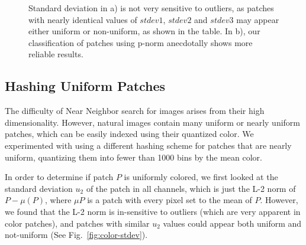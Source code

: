 \begin{figure}[ht!]
\caption{Standard deviation in a) is not very sensitive
to outliers, as patches with nearly identical
values of $stdev1$, $stdev2$ and $stdev3$ may appear
either uniform or non-uniform, as shown in the table.
In b), our classification of patches using
p-norm anecdotally shows more reliable results.}
\end{figure}

\subsection{Hashing Uniform Patches}\label{ssec:uni-nn}

The difficulty of Near Neighbor search for images arises from
their high dimensionality. However, natural images contain many uniform
or nearly uniform patches, which can be easily indexed using
their quantized color. We experimented with using a different
hashing scheme for patches that are nearly uniform, quantizing
them into fewer than 1000 bins by the mean color.

In order to determine if patch $P$ is uniformly colored, we first
looked at the standard deviation $u_2$ of the patch in all channels, which is
just the L-2 norm of $P-\mu(P)$, where $\mu{P}$ is a patch
with every pixel set to the mean of $P$.
However, we found that the L-2 norm is in-sensitive to outliers
(which are very apparent in color patches),
and patches with similar $u_2$ values could appear both uniform
and not-uniform (See Fig.~\ref{fig:color-stdev}).

